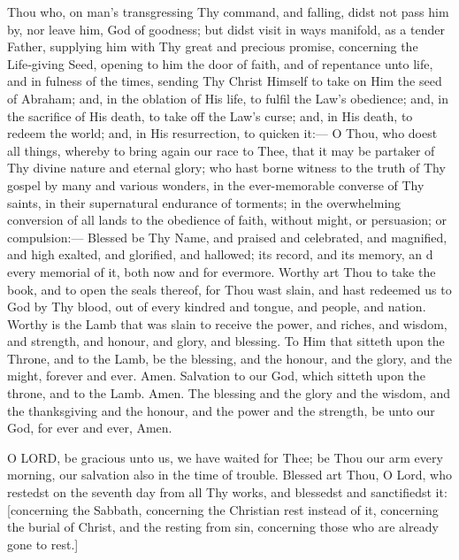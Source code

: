 
Thou who, on man’s transgressing Thy command, and falling, didst not pass him by, nor leave him, God of goodness; but didst visit in ways manifold, as a tender Father, supplying him with Thy great and precious promise, concerning the Life‑giving Seed, opening to him the door of faith, and of repentance unto life, and in fulness of the times, sending Thy Christ Himself to take on Him the seed of Abraham; and, in the oblation of His life, to fulfil the Law’s obedience; and, in the sacrifice of His death, to take off the Law’s curse; and, in His death, to redeem the world; and, in His resurrection, to quicken it:— O Thou, who doest all things, whereby to bring again our race to Thee, that it may be partaker of Thy divine nature and eternal glory; who hast borne witness to the truth of Thy gospel by many and various wonders, in the ever-memorable converse of Thy saints, in their supernatural endurance of torments; in the overwhelming conversion of all lands to the obedience of faith, without might, or persuasion; or compulsion:— Blessed be Thy Name, and praised and celebrated, and magnified, and high exalted, and glorified, and hallowed; its record, and its memory, an d every memorial of it, both now and for evermore.  Worthy art Thou to take the book, and to open the seals thereof, for Thou wast slain, and hast redeemed us to God by Thy blood, out of every kindred and tongue, and people, and nation. Worthy is the Lamb that was slain to receive the power, and riches, and wisdom, and strength, and honour, and glory, and blessing. To Him that sitteth upon the Throne, and to the Lamb, be the blessing, and the honour, and the glory, and the might, forever and ever. Amen. Salvation to our God, which sitteth upon the throne, and to the Lamb. Amen. The blessing and the glory and the wisdom, and the thanksgiving and the honour, and the power and the strength, be unto our God, for ever and ever, Amen.



O LORD, be gracious unto us, we have waited for Thee; be Thou our arm every morning, our salvation also in the time of trouble. Blessed art Thou, O Lord, who restedst on the seventh day from all Thy works, and blessedst and sanctifiedst it: [concerning the Sabbath, concerning the Christian rest instead of it, concerning the burial of Christ, and the resting from sin, concerning those who are already gone to rest.]

